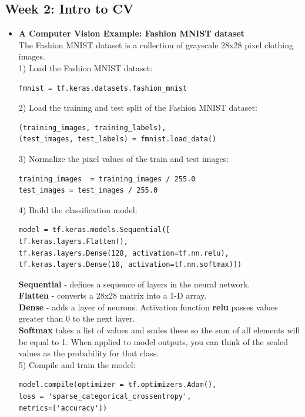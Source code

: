 \documentclass[20pt]{article}
\begin{document}
	\subsection{Week 2: Intro to CV}
	\begin{itemize}
		\item \textbf{A Computer Vision Example: Fashion MNIST dataset}
		\\
		The Fashion MNIST dataset is a collection of grayscale 28x28 pixel clothing images.
		\\
		1) Load the Fashion MNIST dataset:
		\begin{verbatim}
fmnist = tf.keras.datasets.fashion_mnist
		\end{verbatim}
		2) Load the training and test split of the Fashion MNIST dataset:
		\begin{verbatim}
(training_images, training_labels), 
(test_images, test_labels) = fmnist.load_data()
		\end{verbatim}
		3) Normalize the pixel values of the train and test images:
		\begin{verbatim}
training_images  = training_images / 255.0
test_images = test_images / 255.0
		\end{verbatim}
		4) Build the classification model:
		\begin{verbatim}
model = tf.keras.models.Sequential([
tf.keras.layers.Flatten(), 
tf.keras.layers.Dense(128, activation=tf.nn.relu), 
tf.keras.layers.Dense(10, activation=tf.nn.softmax)])
		\end{verbatim}
		\textbf{Sequential} - defines a sequence of layers in the neural network.\\ \textbf{Flatten} - converts a 28x28 matrix into a 1-D array.\\ \textbf{Dense} - adds a layer of neurons.  
		Activation function \textbf{relu} passes values greater than 0 to the next layer.\\ \textbf{Softmax} takes a list of values and scales these so the sum of all elements will be equal to 1. When applied to model outputs, you can think of the scaled values as the probability for that class.
		\\
		5) Compile and train the model:
		\begin{verbatim}
model.compile(optimizer = tf.optimizers.Adam(),
loss = 'sparse_categorical_crossentropy',
metrics=['accuracy'])


\end{verbatim}
\end{itemize}
\end{document}
